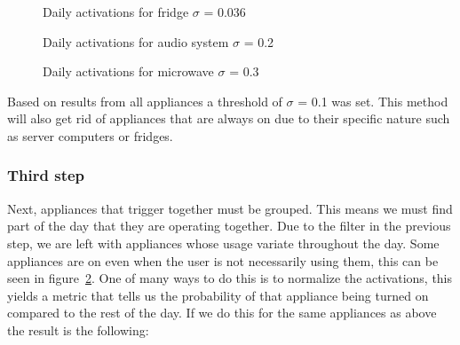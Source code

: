 \begin{figure}[H]
    \centering
    \caption{Daily activations for fridge $\sigma$ = 0.036}
    \label{arr:fridge_acts}
\end{figure}

\begin{figure}[H]
    \centering
    \caption{Daily activations for audio system $\sigma$ = 0.2}
    \label{arr:as_acts}
\end{figure}

\begin{figure}[H]
    \centering
    \caption{Daily activations for microwave $\sigma$ = 0.3}
    \label{arr:microwave_acts}
\end{figure}

Based on results from all appliances a threshold of $\sigma$ = 0.1 was set.
This method will also get rid of appliances that are always on due to their specific nature such as server computers 
or fridges. 

\subsubsection{Third step}

Next, appliances that trigger together must be grouped. 
This means we must find part of the day that they are operating together.
Due to the filter in the previous step, we are left with appliances whose usage variate throughout the day. 
Some appliances are on even when the user is not necessarily using them, this can be seen in figure \ref{arr:as_acts}.
One of many ways to do this is to normalize the activations, this yields a metric that tells us the probability of that appliance being turned on compared to the rest of the day. 
If we do this for the same appliances as above the result is the following: 


